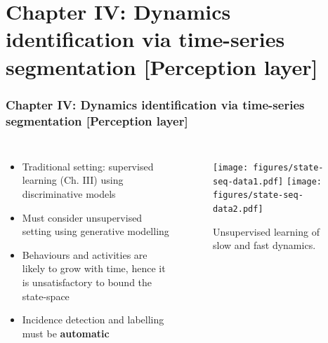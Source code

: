 \documentclass[aspectratio=169]{beamer}
\begin{document}
\section{Chapter IV: Dynamics identification via time-series segmentation [Perception layer]}

\begin{frame}[plain]
    \frametitle{Chapter IV: Dynamics identification via time-series segmentation [Perception layer]}
    \begin{columns}[t] 
        \begin{itemize}
            \item Traditional setting: supervised learning (Ch. III) using discriminative models
            \item Must consider unsupervised setting using generative modelling 
            \item Behaviours and activities are likely to grow with time, hence it is unsatisfactory to bound the
                state-space 
            \item Incidence detection and labelling must be {\bf automatic} 
        \end{itemize}
        \begin{figure}
            \centering
            \texttt{[image: figures/state-seq-data1.pdf]}
            \texttt{[image: figures/state-seq-data2.pdf]}
            \caption{Unsupervised learning of slow and fast dynamics.}
        \end{figure}
    \end{columns}
\end{frame}

\end{document}
